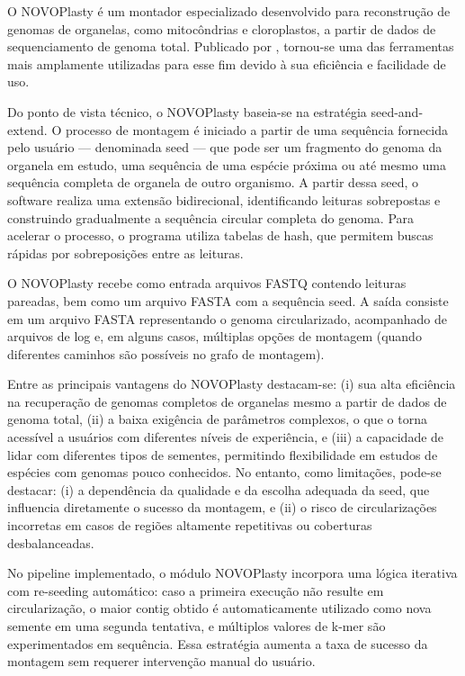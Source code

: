 O NOVOPlasty é um montador especializado desenvolvido para reconstrução de genomas de organelas, como mitocôndrias e cloroplastos, a partir de dados de sequenciamento de genoma total. Publicado por , tornou-se uma das ferramentas mais amplamente utilizadas para esse fim devido à sua eficiência e facilidade de uso.

Do ponto de vista técnico, o NOVOPlasty baseia-se na estratégia seed-and-extend. O processo de montagem é iniciado a partir de uma sequência fornecida pelo usuário --- denominada seed --- que pode ser um fragmento do genoma da organela em estudo, uma sequência de uma espécie próxima ou até mesmo uma sequência completa de organela de outro organismo. A partir dessa seed, o software realiza uma extensão bidirecional, identificando leituras sobrepostas e construindo gradualmente a sequência circular completa do genoma. Para acelerar o processo, o programa utiliza tabelas de hash, que permitem buscas rápidas por sobreposições entre as leituras.

O NOVOPlasty recebe como entrada arquivos FASTQ contendo leituras pareadas, bem como um arquivo FASTA com a sequência seed. A saída consiste em um arquivo FASTA representando o genoma circularizado, acompanhado de arquivos de log e, em alguns casos, múltiplas opções de montagem (quando diferentes caminhos são possíveis no grafo de montagem).

Entre as principais vantagens do NOVOPlasty destacam-se: (i) sua alta eficiência na recuperação de genomas completos de organelas mesmo a partir de dados de genoma total, (ii) a baixa exigência de parâmetros complexos, o que o torna acessível a usuários com diferentes níveis de experiência, e (iii) a capacidade de lidar com diferentes tipos de sementes, permitindo flexibilidade em estudos de espécies com genomas pouco conhecidos. No entanto, como limitações, pode-se destacar: (i) a dependência da qualidade e da escolha adequada da seed, que influencia diretamente o sucesso da montagem, e (ii) o risco de circularizações incorretas em casos de regiões altamente repetitivas ou coberturas desbalanceadas.

No pipeline implementado, o módulo NOVOPlasty incorpora uma lógica iterativa com re-seeding automático: caso a primeira execução não resulte em circularização, o maior contig obtido é automaticamente utilizado como nova semente em uma segunda tentativa, e múltiplos valores de k-mer são experimentados em sequência. Essa estratégia aumenta a taxa de sucesso da montagem sem requerer intervenção manual do usuário.

